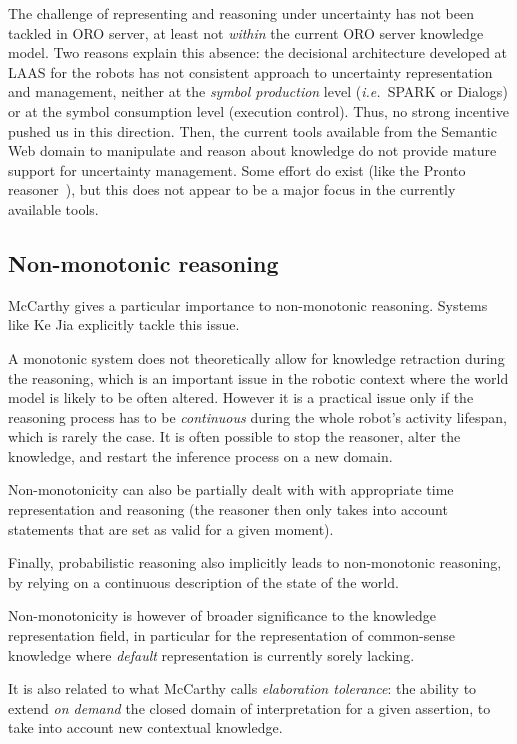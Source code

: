 \documentclass[a4paper, twocolumn]{article}
\newcommand{\ie}{{\textit{i.e.\ }}}
\begin{document}
The challenge of representing and reasoning under uncertainty has not been
tackled in ORO server, at least not \emph{within} the current ORO server
knowledge model. Two reasons explain this absence: the decisional architecture
developed at LAAS for the robots has not consistent approach to uncertainty
representation and management, neither at the \emph{symbol production} level
(\ie SPARK or {\sc Dialogs}) or at the symbol consumption level (execution
control). Thus, no strong incentive pushed us in this direction. Then, the
current tools available from the Semantic Web domain to manipulate and reason
about knowledge do not provide mature support for uncertainty management. Some
effort do exist (like the {\sc Pronto} reasoner~\cite{Klinov2008}), but this
does not appear to be a major focus in the currently available tools.

\subsection{Non-monotonic reasoning}

McCarthy gives a particular importance to non-monotonic reasoning. Systems like
Ke Jia explicitly tackle this issue.

A monotonic system does not theoretically allow for knowledge retraction during
the reasoning, which is an important issue in the robotic context where the
world model is likely to be often altered.  However it is a practical issue
only if the reasoning process has to be \emph{continuous} during the whole
robot's activity lifespan, which is rarely the case. It is often possible to
stop the reasoner, alter the knowledge, and restart the inference process on a
new domain.

Non-monotonicity can also be partially dealt with with appropriate time
representation and reasoning (the reasoner then only takes into account
statements that are set as valid for a given moment).

Finally, probabilistic reasoning also implicitly leads to non-monotonic
reasoning, by relying on a continuous description of the state of the
world.

Non-monotonicity is however of broader significance to the knowledge
representation field, in particular for the representation of common-sense
knowledge where \emph{default} representation is currently sorely lacking.

It is also related to what McCarthy calls \emph{elaboration tolerance}: the
ability to extend \emph{on demand} the closed domain of interpretation for a
given assertion, to take into account new contextual knowledge.
\end{document}
